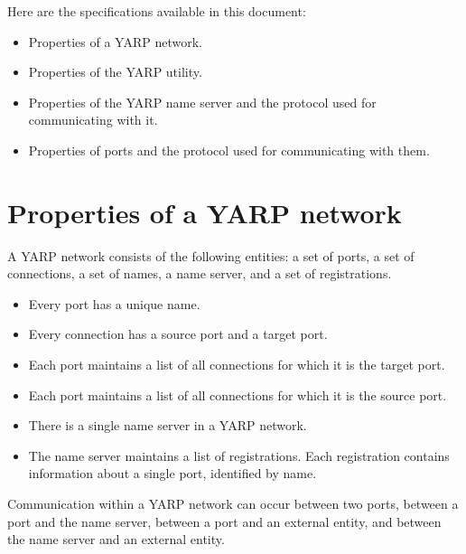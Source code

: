 Here are the specifications available in this document:
%
\begin{itemize}

\item Properties of a YARP network.

\item Properties of the YARP utility.

\item Properties of the YARP name server and the protocol used 
for communicating with it.

\item Properties of ports and the protocol used
for communicating with them.

\end{itemize}


\section{Properties of a YARP network}

A YARP network consists of the following entities: a set of
ports, a set of connections, a set of names, a name server, and a set
of registrations.

\begin{itemize} \pflist

\item Every port has a unique name.

\item Every connection has a source port and a target port.

\item Each port maintains a list of all connections for which it
is the target port.

\item Each port maintains a list of all connections for which it
is the source port.

\item There is a single name server in a YARP network.

\item The name server maintains a list of registrations.  Each 
registration contains information about a single port, identified
by name.

\end{itemize}


\noindent
Communication within a YARP network can occur between two ports,
between a port and the name server, between a port and an
external entity, and between the name server and an external entity.


